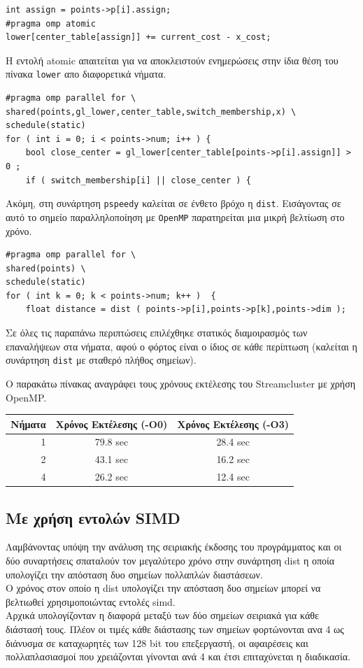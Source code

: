 \documentclass[a4paper,11pt]{article}
\begin{document}
\begin{lstlisting}
int assign = points->p[i].assign;
#pragma omp atomic
lower[center_table[assign]] += current_cost - x_cost;
\end{lstlisting}
Η εντολή atomic απαιτείται για να αποκλειστούν ενημερώσεις στην ίδια θέση του πίνακα \texttt{lower} απο διαφορετικά νήματα.

\begin{lstlisting}
#pragma omp parallel for \
shared(points,gl_lower,center_table,switch_membership,x) \
schedule(static)
for ( int i = 0; i < points->num; i++ ) {
    bool close_center = gl_lower[center_table[points->p[i].assign]] > 0 ;
    if ( switch_membership[i] || close_center ) {
\end{lstlisting}

Ακόμη, στη συνάρτηση \texttt{pspeedy} καλείται σε ένθετο βρόχο η \texttt{dist}. Εισάγοντας σε αυτό το σημείο παραλληλοποίηση με \texttt{OpenMP} παρατηρείται μια μικρή βελτίωση στο χρόνο.

\begin{lstlisting}
#pragma omp parallel for \
shared(points) \
schedule(static)
for ( int k = 0; k < points->num; k++ )  {
    float distance = dist ( points->p[i],points->p[k],points->dim );
\end{lstlisting}

Σε όλες τις παραπάνω περιπτώσεις επιλέχθηκε στατικός διαμοιρασμός των επαναλήψεων στα νήματα, αφού ο φόρτος είναι ο ίδιος σε κάθε περίπτωση (καλείται η συνάρτηση \texttt{dist} με σταθερό πλήθος σημείων).

Ο παρακάτω πίνακας αναγράφει τους χρόνους εκτέλεσης του Streamcluster με χρήση OpenMP.

\begin{center}
\begin{tabular}{|r|c|c|}
    \hline
    Νήματα & Χρόνος Εκτέλεσης (-Ο0) & Χρόνος Εκτέλεσης (-Ο3) \\ \hline
    1 & 79.8 sec & 28.4 sec \\
    2 & 43.1 sec & 16.2 sec \\
    4 & 26.2 sec & 12.4 sec \\ \hline
\end{tabular}
\end{center}

\subsection{Με χρήση εντολών SIMD}
Λαμβάνοντας υπόψη την ανάλυση της σειριακής έκδοσης του προγράμματος και οι δύο συναρτήσεις σπαταλούν τον μεγαλύτερο χρόνο στην συνάρτηση dist η οποία υπολογίζει την απόσταση δυο σημείων πολλαπλών διαστάσεων.\\
Ο χρόνος στον οποίο η dist υπολογίζει την απόσταση δυο σημείων μπορεί να βελτιωθεί χρησιμοποιώντας εντολές simd.\\
Αρχικά υπολογίζονταν η διαφορά μεταξύ των δύο σημείων σειριακά για κάθε διάστασή τους. Πλέον οι τιμές κάθε διάστασης των σημείων φορτώνονται ανα 4 ως διάνυσμα σε καταχωρητές των 128 bit του επεξεργαστή, οι αφαιρέσεις και πολλαπλασιασμοί που χρειάζονται γίνονται ανά 4 και έτσι επιταχύνεται η διαδικασία.
\end{document}
